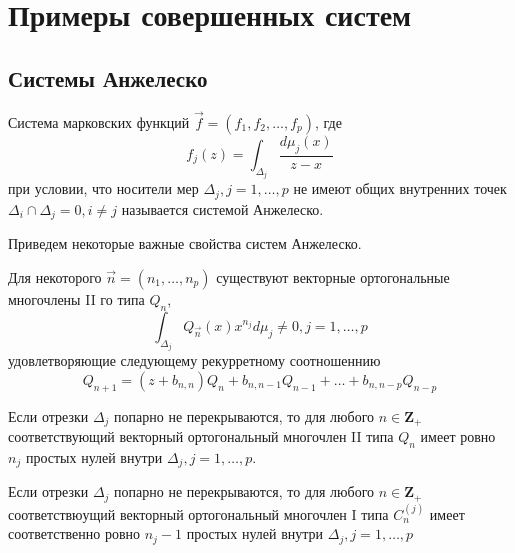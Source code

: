\section{Примеры совершенных систем}
\subsection{Системы Анжелеско}
\begin{defi}
Система марковских функций
$\overrightarrow{f}=(f_1,f_2,\ldots,f_p)$, где
$$
 f_j(z)
=\int_{\Delta_j}{\displaystyle\frac{d\mu_j(x)}{z-x}}
$$
при условии, что носители мер ${\Delta_j},j=1,\ldots,p$ не имеют
общих внутренних точек ${\Delta_i}\cap{\Delta_j} = 0, i\not=j $
называется системой Анжелеско.
\end{defi}
Приведем некоторые важные свойства систем Анжелеско.
\begin{prope}Для некоторого $\overrightarrow{n}=(n_1,\ldots, n_p)$ существуют векторные
ортогональные многочлены II го типа $Q_n$,
$$
\int_{\Delta_j} {Q_{\overrightarrow{n}}(x)x^{n_j}d\mu_j} \not=0,
j=1,\ldots,p
$$
удовлетворяющие следующему рекурретному соотношеннию
$$
Q_{n+1}=(z+b_{n,n})Q_n+b_{n,n-1}Q_{n-1}+\ldots+b_{n,n-p}Q_{n-p}
$$
\end{prope}

\begin{prope}
\label{prope_3.1} Если отрезки ${\Delta_j}$ попарно не
перекрываются, то для любого $n \in \textbf{Z} _{+}$
соответствующий векторный ортогональный многочлен II типа $Q_n$
имеет ровно $n_j$ простых нулей внутри $\Delta_j, j=1,\ldots,p$.
\end{prope}

\begin{prope}
Если отрезки ${\Delta_j}$ попарно не перекрываются, то для любого
$n \in \textbf{Z} _{+}$ соответствюущий векторный ортогональный
многочлен I типа $ C^{(j)}_n $ имеет соответственно ровно $n_j-1$
простых нулей внутри $\Delta_j, j=1,\ldots,p$
\end{prope}

